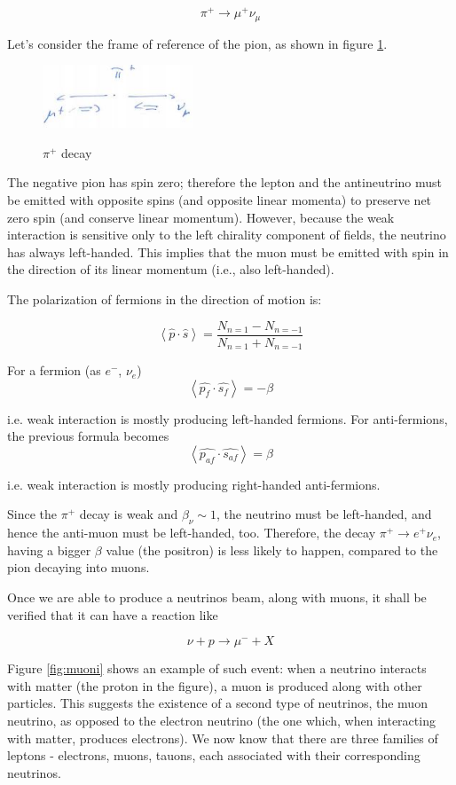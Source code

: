 \[\pi^+ \rightarrow \mu^+\nu_{\mu}\]

Let's consider the frame of reference of the pion, as shown in figure \ref{fig:muon}.

\begin{figure}[!h]
    \centering
    \includegraphics[width=0.4\textwidth]{Figures/FNSN31_13.JPG}
    \label{fig:muon}
    \caption{$\pi^+$ decay}
\end{figure}

The negative pion has spin zero; therefore the lepton and the antineutrino must be emitted with opposite spins (and opposite linear momenta) to preserve net zero spin (and conserve linear momentum). However, because the weak interaction is sensitive only to the left chirality component of fields, the neutrino has always left-handed. This implies that the muon must be emitted with spin in the direction of its linear momentum (i.e., also left-handed).

The polarization of fermions in the direction of motion is:

\[\left \langle \hat{p} \cdot \hat{s} \right \rangle = \frac{N_{n = 1}-N_{n = -1}}{N_{n = 1} + N_{n = -1}}\]

For a fermion (as $e^-$, $\nu_e$)
 \[\left \langle \hat{p_f} \cdot \hat{s_f} \right \rangle = -\beta \]
 
i.e. weak interaction is mostly producing left-handed fermions.
For anti-fermions, the previous formula becomes
 \[\left \langle \hat{p_{af}} \cdot \hat{s_{af}} \right \rangle = \beta \]
 
i.e. weak interaction is mostly producing right-handed anti-fermions.


Since the $\pi^+$ decay is weak and $\beta_{\nu} \sim 1$, the neutrino must be left-handed, and hence the anti-muon must be left-handed, too.
Therefore, the decay $\pi^+ \rightarrow e^+\nu_e$, having a bigger $\beta$ value (the positron) is less likely to happen, compared to the pion decaying into muons.

Once we are able to produce a neutrinos beam, along with muons, it shall be verified that it can have a reaction like

\[ \nu + p \rightarrow \mu^- + X \]

Figure \ref{fig:muoni} shows an example of such event: when a neutrino interacts with matter (the proton in the figure), a muon is produced along with other particles. This suggests the existence of a second type of neutrinos, the muon neutrino, as opposed to the electron neutrino (the one which, when interacting with matter, produces electrons). We now know that there are three families of leptons - electrons, muons, tauons, each associated with their corresponding neutrinos.


